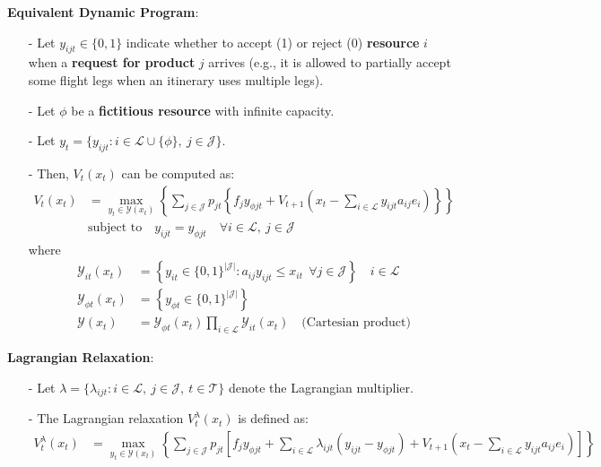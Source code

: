 \documentclass[11pt]{article}
\begin{document}
\vspace{0.5cm}

\noindent
\textbf{Equivalent Dynamic Program}:
\begin{itemize}[itemsep=0pt,parsep=0pt]
\item[-] Let $y_{ijt}\in\{0,1\}$ indicate whether to accept (1) or reject (0) \textbf{resource} $i$ when a \textbf{request for product} $j$ arrives (e.g., it is allowed to partially accept some flight legs when an itinerary uses multiple legs).
\item[-] Let $\phi$ be a \textbf{fictitious resource} with infinite capacity. 
\item[-] Let $y_t = \{y_{ijt} : i \in \mathcal{L} \cup \{\phi\}, \ j \in \mathcal{J}\}$.
\item[-] Then, $V_t(x_t)$ can be computed as:
    \begin{align*}
        V_t(x_t) &= \max_{y_t \in \mathcal{Y}(x_t)}
            \left\{ \sum_{j\in \mathcal{J}} p_{jt} 
            \left\{ 
                f_j y_{\phi jt} + 
                V_{t+1} \left(x_t - \sum_{i\in \mathcal{L}}y_{ijt}a_{ij}e_i\right) 
            \right\} \right\}
        \tag{DP2} \\
        & \text{subject to} \quad y_{ijt} = y_{\phi jt} \quad \forall i \in \mathcal{L}, \ j \in \mathcal{J}
    \end{align*}
    where
    \begin{align*}
        \mathcal{Y}_{it}(x_t) &= \left\{ 
            y_{it} \in \{0,1\}^{|\mathcal{J}|} : 
            a_{ij} y_{ijt} \leq x_{it} \ \ 
            \forall j \in \mathcal{J} 
        \right\} \quad i \in \mathcal{L} \\
        \mathcal{Y}_{\phi t}(x_t) &= \left\{ 
            y_{\phi t} \in \{0,1\}^{|\mathcal{J}|} 
        \right\} \\
        \mathcal{Y}(x_t) &= \mathcal{Y}_{\phi t}(x_t) \prod_{i \in \mathcal{L}} \mathcal{Y}_{it}(x_t) \quad \text{(Cartesian product)}
    \end{align*}
\end{itemize}

\vspace{0.5cm}

\noindent
\textbf{Lagrangian Relaxation}:
\begin{itemize}[itemsep=0pt,parsep=0pt]
\item[-] Let $\lambda = \{\lambda_{ijt} : i \in \mathcal{L}, \ j \in \mathcal{J}, \ t \in \mathcal{T}\}$ denote the Lagrangian multiplier. 
\item[-] The Lagrangian relaxation $V^{\lambda}_t(x_t)$ is defined as:
    {\small
    \begin{align*}
        V^{\lambda}_t(x_t) &= \max_{y_t \in \mathcal{Y}(x_t)} 
            \left\{ \sum_{j\in \mathcal{J}} p_{jt} 
            \left[ 
                f_j y_{\phi jt} +
                \sum_{i \in \mathcal{L}} \lambda_{ijt} (y_{ijt} - y_{\phi jt}) + 
                V_{t+1} \left(x_t - \sum_{i\in \mathcal{L}}y_{ijt}a_{ij}e_i\right) 
            \right] \right\}
            \tag{LR} \\
    \end{align*}
    }%
\end{itemize}
\end{document}

